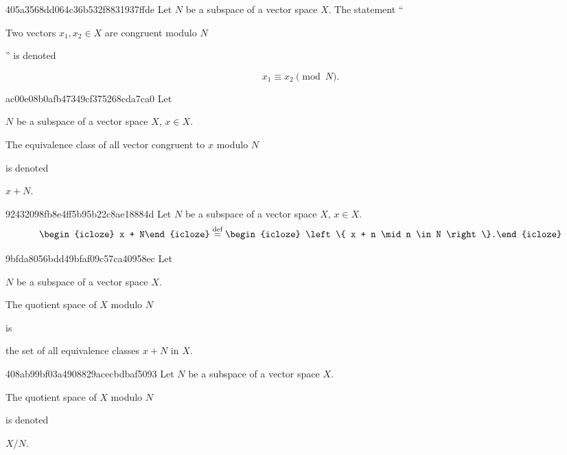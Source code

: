\begin{note}{405a3568dd064c36b532f8831937ffde}
    Let \({ N }\) be a subspace of a vector space \({ X }\).
    The statement ``\begin{icloze}{1}Two vectors \({ x_1, x_2 \in X }\) are congruent modulo \({ N }\)\end{icloze}'' is denoted
    \begin{icloze}{2}
        \[
            x_1 \equiv x_2 \pmod{N}.
        \]
    \end{icloze}
\end{note}

\begin{note}{ac00e08b0afb47349cf375268cda7ca0}
    Let \begin{icloze}{3}\({ N }\) be a subspace of a vector space \({ X }\), \({ x \in X }\).\end{icloze}
    \begin{icloze}{1}The equivalence class of all vector congruent to \({ x }\) modulo \({ N }\)\end{icloze} is denoted \begin{icloze}{2}\(x + N\).\end{icloze}
\end{note}

\begin{note}{92432098fb8e4ff5b95b22c8ae18884d}
    Let \({ N }\) be a subspace of a vector space \({ X }\), \({ x \in X }\).
    \[
        \begin{icloze}{2}x + N\end{icloze} \overset{\text{def}}= \begin{icloze}{1}\left\{ x + n \mid n \in N \right\}.\end{icloze}
    \]
\end{note}

\begin{note}{9bfda8056bdd49bfaf09c57ca40958ec}
    Let \begin{icloze}{3}\({ N }\) be a subspace of a vector space \({ X }\).\end{icloze}
    \begin{icloze}{2}The quotient space of \({ X }\) modulo \({ N }\)\end{icloze} is \begin{icloze}{1}the set of all equivalence classes \({ x + N }\) in \({ X }\).\end{icloze}
\end{note}

\begin{note}{408ab99bf03a4908829acecbdbaf5093}
    Let \({ N }\) be a subspace of a vector space \({ X }\).
    \begin{icloze}{1}The quotient space of \({ X }\) modulo \({ N }\)\end{icloze} is denoted \begin{icloze}{2}\({ X / N }\).\end{icloze}
\end{note}

